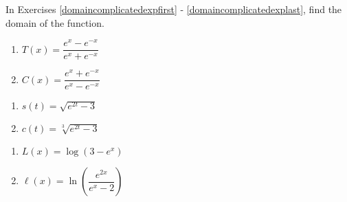 \pagebreak

In Exercises \ref{domaincomplicatedexpfirst} - \ref{domaincomplicatedexplast},  find the domain of the function.

\begin{multicols}{2} 
\begin{enumerate}
\setcounter{enumi}{\value{HW}}

\item  $T(x) = \dfrac{e^{x} - e^{-x}}{e^{x} + e^{-x}}$     \label{domaincomplicatedexpfirst}

\item   $C(x) = \dfrac{e^{x}  + e^{-x}}{e^{x}  - e^{-x}}$ 

\setcounter{HW}{\value{enumi}}
\end{enumerate}
\end{multicols}


\begin{multicols}{2} 
\begin{enumerate}
\setcounter{enumi}{\value{HW}}

\item     $s(t) = \sqrt{e^{2t} - 3}$
\item     $c(t) = \sqrt[3]{e^{2t} - 3}$

\setcounter{HW}{\value{enumi}}
\end{enumerate}
\end{multicols}

\begin{multicols}{2} 
\begin{enumerate}
\setcounter{enumi}{\value{HW}}
  
\item     $L(x) = \log\left( 3 - e^{x} \right)$  

\item    $\ell(x) = \ln\left( \dfrac{e^{2x}}{e^{x}-2} \right)$  \label{domaincomplicatedexplast}

\setcounter{HW}{\value{enumi}}
\end{enumerate}
\end{multicols}




